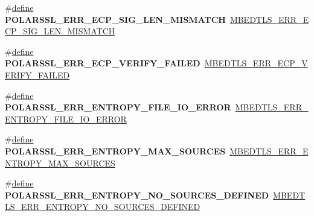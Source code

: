 \begin{DoxyCompactItemize}
\item 
\mbox{\label{compat-1_83_8h_a1d2b0f995bf076c5ce5bbc7deb94150c}} 
\#\hyperlink{structdefine}{define} {\bfseries P\+O\+L\+A\+R\+S\+S\+L\+\_\+\+E\+R\+R\+\_\+\+E\+C\+P\+\_\+\+S\+I\+G\+\_\+\+L\+E\+N\+\_\+\+M\+I\+S\+M\+A\+T\+CH}~\hyperlink{ecp_8h_a49d1dece5c167d28f22702cfc11b9aa1}{M\+B\+E\+D\+T\+L\+S\+\_\+\+E\+R\+R\+\_\+\+E\+C\+P\+\_\+\+S\+I\+G\+\_\+\+L\+E\+N\+\_\+\+M\+I\+S\+M\+A\+T\+CH}
\item 
\mbox{\label{compat-1_83_8h_a250e37c379fd853d666415a8fc308e6e}} 
\#\hyperlink{structdefine}{define} {\bfseries P\+O\+L\+A\+R\+S\+S\+L\+\_\+\+E\+R\+R\+\_\+\+E\+C\+P\+\_\+\+V\+E\+R\+I\+F\+Y\+\_\+\+F\+A\+I\+L\+ED}~\hyperlink{ecp_8h_a3d19895998e4ac7b4744c2407cec1917}{M\+B\+E\+D\+T\+L\+S\+\_\+\+E\+R\+R\+\_\+\+E\+C\+P\+\_\+\+V\+E\+R\+I\+F\+Y\+\_\+\+F\+A\+I\+L\+ED}
\item 
\mbox{\label{compat-1_83_8h_a348fa499b6e890de696df6b23d9cce39}} 
\#\hyperlink{structdefine}{define} {\bfseries P\+O\+L\+A\+R\+S\+S\+L\+\_\+\+E\+R\+R\+\_\+\+E\+N\+T\+R\+O\+P\+Y\+\_\+\+F\+I\+L\+E\+\_\+\+I\+O\+\_\+\+E\+R\+R\+OR}~\hyperlink{entropy_8h_a356b20cef049a2de3e99909321894463}{M\+B\+E\+D\+T\+L\+S\+\_\+\+E\+R\+R\+\_\+\+E\+N\+T\+R\+O\+P\+Y\+\_\+\+F\+I\+L\+E\+\_\+\+I\+O\+\_\+\+E\+R\+R\+OR}
\item 
\mbox{\label{compat-1_83_8h_a91eeab75dbfc3730efdc415f57e9f4ac}} 
\#\hyperlink{structdefine}{define} {\bfseries P\+O\+L\+A\+R\+S\+S\+L\+\_\+\+E\+R\+R\+\_\+\+E\+N\+T\+R\+O\+P\+Y\+\_\+\+M\+A\+X\+\_\+\+S\+O\+U\+R\+C\+ES}~\hyperlink{entropy_8h_a12a0600bd163efc21469e406a4e194ce}{M\+B\+E\+D\+T\+L\+S\+\_\+\+E\+R\+R\+\_\+\+E\+N\+T\+R\+O\+P\+Y\+\_\+\+M\+A\+X\+\_\+\+S\+O\+U\+R\+C\+ES}
\item 
\mbox{\label{compat-1_83_8h_a0b3765116f6d9d1cbdd5d2c4faee5d33}} 
\#\hyperlink{structdefine}{define} {\bfseries P\+O\+L\+A\+R\+S\+S\+L\+\_\+\+E\+R\+R\+\_\+\+E\+N\+T\+R\+O\+P\+Y\+\_\+\+N\+O\+\_\+\+S\+O\+U\+R\+C\+E\+S\+\_\+\+D\+E\+F\+I\+N\+ED}~\hyperlink{entropy_8h_ab9f0a333fbef6d5ebe4fda846249f5c6}{M\+B\+E\+D\+T\+L\+S\+\_\+\+E\+R\+R\+\_\+\+E\+N\+T\+R\+O\+P\+Y\+\_\+\+N\+O\+\_\+\+S\+O\+U\+R\+C\+E\+S\+\_\+\+D\+E\+F\+I\+N\+ED}
\item 
\mbox{\label{compat-1_83_8h_ab9ff2b3b04c80aa19556ed9676bf35e2}} 

\end{DoxyCompactItemize}

